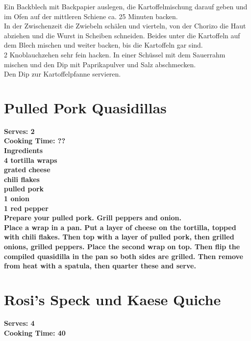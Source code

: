 \documentclass[18pt, oneside]{book}
\begin{document}
Ein Backblech mit Backpapier auslegen, die Kartoffelmischung darauf geben und im Ofen auf der mittleren Schiene ca. 25 Minuten backen. \\

In der Zwischenzeit die Zwiebeln schälen und vierteln, von der Chorizo die Haut abziehen und die Wurst in Scheiben schneiden. Beides unter die Kartoffeln auf dem Blech mischen und weiter backen, bis die Kartoffeln gar sind. \\

2 Knoblauchzehen sehr fein hacken. In einer Schüssel mit dem Sauerrahm mischen und den Dip mit Paprikapulver und Salz abschmecken. \\

Den Dip zur Kartoffelpfanne servieren.

\section{Pulled Pork Quasidillas}

\bf{Serves: 2} \\
\bf{Cooking Time: ??} \\

\bf{Ingredients} \normalfont \\
4 tortilla wraps \\
grated cheese \\
chili flakes \\
pulled pork \\
1 onion \\
1 red pepper \\

Prepare your pulled pork. Grill peppers and onion. \\

Place a wrap in a pan. Put a layer of cheese on the tortilla, topped with chili flakes. Then top with a layer of pulled pork, then grilled onions, grilled peppers. Place the second wrap on top. Then flip the compiled quasidilla in the pan so both sides are grilled. Then remove from heat with a spatula, then quarter these and serve. \\

\section{Rosi's Speck und Kaese Quiche}

\bf{Serves: 4} \\
\bf{Cooking Time: 40} \\
\end{document}

